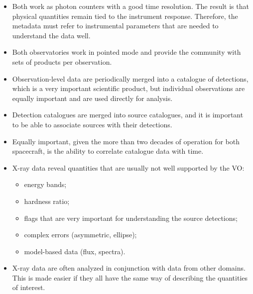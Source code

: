 \begin{itemize}[noitemsep,topsep=0pt,parsep=0pt,partopsep=0pt]
    \item Both work as photon counters with a good time resolution.
          The result is that physical quantities remain tied to the instrument response.
          Therefore, the metadata must refer to instrumental parameters that are needed to
          understand the data well.
    \item Both observatories work in pointed mode and provide the community with sets of products per observation.
    \item Observation-level data are periodically merged into a catalogue of detections, 
          which is a very important scientific product,
          but individual observations are equally important and are used directly for analysis. 
     \item Detection catalogues are merged into source catalogues, and it is important to be able to
           associate sources with their detections.
     \item Equally important, given the more than two decades of operation for both spacecraft,
           is the ability to correlate catalogue data with time.
     \item X-ray data reveal quantities that are usually not well supported by the VO: 
           \begin{itemize}
               \item energy bands;
               \item hardness ratio;
               \item flags that are very important for understanding the source detections;
               \item complex errors (asymmetric, ellipse);
               \item model-based data (flux, spectra).
           \end{itemize}
    \item X-ray data are often analyzed in conjunction with data from other domains. 
          This is made easier if they all have the same way of describing the quantities of interest.
\end{itemize}



